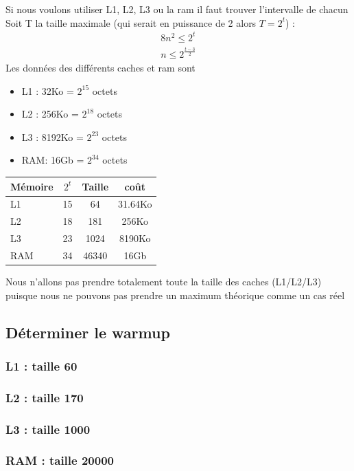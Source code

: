 \documentclass{report}
\begin{document}
    Si nous voulons utiliser L1, L2, L3 ou la ram il faut trouver l'intervalle de chacun
    Soit T la taille maximale (qui serait en puissance de 2 alors $T=2^t$) :
    \begin{align}
      8n^2 \leq 2^t \\
      n \leq 2^{\frac{t-3}{2}}
    \end{align}
    Les données des différents caches et ram sont
    \begin{itemize}
      \item L1 : 32Ko   = $2^{15}$ octets
      \item L2 : 256Ko  = $2^{18}$ octets
      \item L3 : 8192Ko = $2^{23}$ octets
      \item RAM: 16Gb   = $2^{34}$ octets
    \end{itemize}
    \vspace{5mm}
    \begin{tabular}{|l| c | c | c|}
      \hline
      Mémoire & $2^t$ & Taille & coût \\\hline
      \hline
      L1 & 15 & 64 & 31.64Ko \\\hline
      L2 & 18 & 181 & 256Ko \\\hline
      L3 & 23 & 1024 & 8190Ko \\\hline
      RAM & 34 & 46340 & 16Gb \\\hline
    \end{tabular}
    Nous n'allons pas prendre totalement toute la taille des caches (L1/L2/L3) puisque nous ne
    pouvons pas prendre un maximum théorique comme un cas réel
    \subsection{Déterminer le warmup}
    \subsubsection{L1 : taille 60}
    \subsubsection{L2 : taille 170}
    \subsubsection{L3 : taille 1000}
    \subsubsection{RAM : taille 20000}
\end{document}
